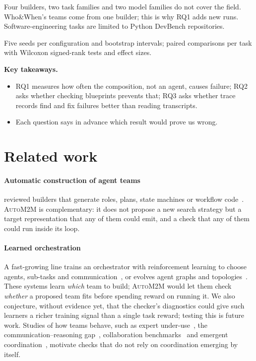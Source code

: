 \documentclass[10pt,a4paper]{article}
\newcommand{\auto}{\textsc{AutoM2M}}
\newcommand{\what}[1]{\par\smallskip\noindent{\sffamily\bfseries\color{accent}#1}\quad}
\newenvironment{takeaway}{%
  \begin{tcolorbox}[enhanced, colback=keybg, colframe=keybg, arc=0pt, boxrule=0pt,
     borderline west={2.2pt}{0pt}{keybar}, left=8pt, right=8pt, top=5pt, bottom=5pt,
     before skip=8pt, after skip=8pt]
  \textsf{\bfseries\color{keybar}Key takeaways.}\par\smallskip}{\end{tcolorbox}}
\begin{document}
\what{External.} Four builders, two task families and two model families
do not cover the field. Who\&When's teams come from one builder; this is
why RQ1 adds new runs. Software-engineering tasks are limited to Python
DevBench repositories.

\what{Conclusion.} Five seeds per configuration and bootstrap intervals;
paired comparisons per task with Wilcoxon signed-rank tests and effect
sizes.

\begin{takeaway}
\begin{itemize}
\item RQ1 measures how often the composition, not an agent, causes failure;
RQ2 asks whether checking blueprints prevents that; RQ3 asks whether trace
records find and fix failures better than reading transcripts.
\item Each question says in advance which result would prove us wrong.
\end{itemize}
\end{takeaway}

\section{Related work}\label{sec:related}

\paragraph{Automatic construction of agent teams} 
reviewed builders that generate roles, plans, state machines or workflow
code~\cite{song2024captain,chen2024autoagents,chen2024agentverse,liu2024dylan,yuan2025evoagent,zhang2025metaagent,ke2025maszero,hu2025adas,zhang2025aflow,zhang2025maas,zhuge2024gptswarm,qian2025macnet,he2026tpgo}.
\auto{} is complementary: it does not propose a new search strategy but a
target representation that any of them could emit, and a check that any of
them could run inside its loop.

\paragraph{Learned orchestration} A fast-growing line trains an
orchestrator with reinforcement learning to choose agents, sub-tasks and
communication~\cite{dang2025puppeteer,nielsen2026conductor,ke2026masorchestra},
or evolves agent graphs and topologies~\cite{yang2025agentnet,zhang2025gdesigner,ma2026ann}.
These systems learn \emph{which} team to build; \auto{} would let them check
\emph{whether} a proposed team fits before spending reward on running it.
We also conjecture, without evidence yet, that the checker's diagnostics
could give such learners a richer training signal than a single task
reward; testing this is future work. Studies
of how teams behave, such as expert under-use~\cite{pappu2026experts}, the
communication--reasoning gap~\cite{zhang2026silobench}, collaboration
benchmarks~\cite{zhu2025multiagentbench} and emergent
coordination~\cite{riedl2026emergent}, motivate checks that do not rely on
coordination emerging by itself.
\end{document}

